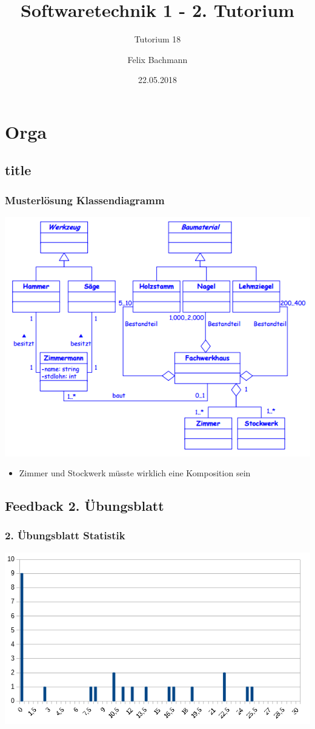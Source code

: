 \documentclass[18pt]{beamer}
\title[SWT1]{Softwaretechnik 1 - 2. Tutorium}
\subtitle{Tutorium 18}
\author{Felix Bachmann}
\date{22.05.2018}
\institute{KIT - Institut für Programmstrukturen und Datenorganisation (IPD)}
\begin{document}

\begin{frame}
\titlepage
\end{frame}

\section{Orga}
	\subsection{title}
	\begin{frame}
		\frametitle{Musterlösung Klassendiagramm}
		\includegraphics[scale=0.4]{./pics/tut1/solution.png}
		\begin{itemize}
			\item Zimmer und Stockwerk müsste wirklich eine Komposition sein
		\end{itemize}
\end{frame}
	\subsection{Feedback 2. Übungsblatt}
	\begin{frame}
		\frametitle{2. Übungsblatt Statistik}
		\includegraphics[scale=0.7]{./pics/tut2/statistics-ub2.png}
	\end{frame}
\end{document}
